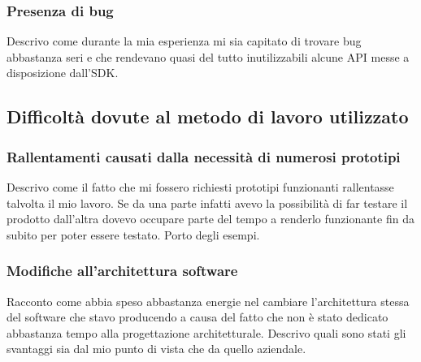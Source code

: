 			\subsubsection{Presenza di bug}
				Descrivo come durante la mia esperienza mi sia capitato di trovare bug abbastanza seri e che rendevano quasi del
				tutto inutilizzabili alcune API messe a disposizione dall'SDK.
		\subsection{Difficoltà dovute al metodo di lavoro utilizzato}
			\subsubsection{Rallentamenti causati dalla necessità di numerosi prototipi}
				Descrivo come il fatto che mi fossero richiesti prototipi funzionanti rallentasse talvolta il mio lavoro. Se da una
				parte infatti avevo la possibilità di far testare il prodotto dall'altra dovevo occupare parte del tempo a renderlo
				funzionante fin da subito per poter essere testato. Porto degli esempi.
			\subsubsection{Modifiche all'architettura software}
				Racconto come abbia speso abbastanza energie nel cambiare l'architettura stessa del software che stavo producendo
				a causa del fatto che non è stato dedicato abbastanza tempo alla progettazione architetturale. Descrivo quali sono
				stati gli svantaggi sia dal mio punto di vista che da quello aziendale.
